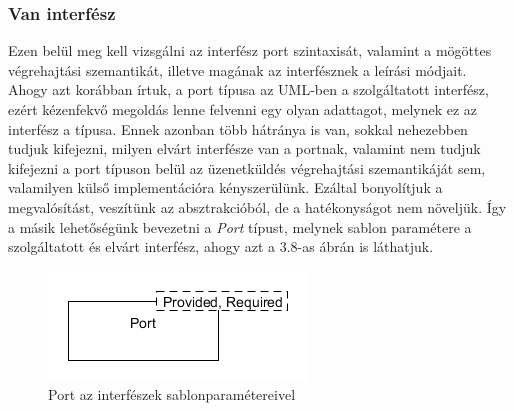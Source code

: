 \documentclass[a4paper,12pt]{report}
\begin{document}
\subsubsection{Van interfész}
Ezen belül meg kell vizsgálni az interfész port szintaxisát, valamint a mögöttes végrehajtási szemantikát, illetve magának az interfésznek a leírási módjait. \\
Ahogy azt korábban írtuk, a port típusa az UML-ben a szolgáltatott interfész, ezért kézenfekvő megoldás lenne felvenni egy olyan adattagot, melynek ez az interfész a típusa. Ennek azonban több hátránya is van, sokkal nehezebben tudjuk kifejezni, milyen elvárt interfésze van a portnak, valamint nem tudjuk kifejezni a port típuson belül az üzenetküldés végrehajtási szemantikáját sem, valamilyen külső implementációra kényszerülünk. Ezáltal bonyolítjuk a megvalósítást, veszítünk az absztrakcióból, de a hatékonyságot nem növeljük. 
Így a másik lehetőségünk bevezetni a \textit{Port} típust, melynek sablon paramétere a szolgáltatott és elvárt interfész, ahogy azt a 3.8-as ábrán is láthatjuk. \\

\begin{figure}[H]
\begin{center}
\includegraphics[scale=0.7]{port_class.png}
\end{center}
\caption{Port az interfészek sablonparamétereivel}
\end{figure} 
\end{document}
